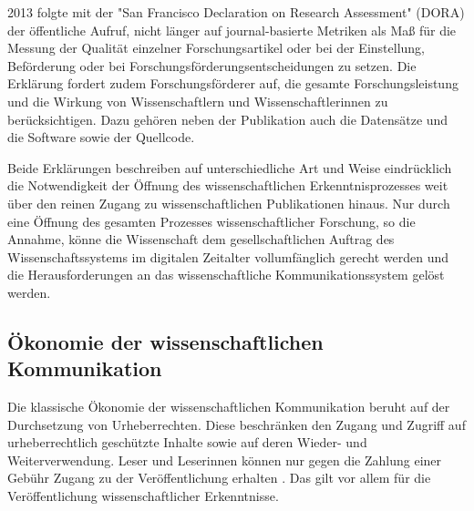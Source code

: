 2013 folgte mit der "San Francisco Declaration on Research Assessment" (DORA) \cite{DORA_2013} der öffentliche Aufruf, nicht länger auf journal-basierte Metriken als Maß für die Messung der Qualität einzelner Forschungsartikel oder bei der Einstellung, Beförderung oder bei Forschungsförderungsentscheidungen zu setzen. Die Erklärung fordert zudem Forschungsförderer auf, die gesamte Forschungsleistung und die Wirkung von Wissenschaftlern und Wissenschaftlerinnen zu berücksichtigen. Dazu gehören neben der Publikation auch die Datensätze und die Software sowie der Quellcode.

Beide Erklärungen beschreiben auf unterschiedliche Art und Weise eindrücklich die Notwendigkeit der Öffnung des wissenschaftlichen Erkenntnisprozesses weit über den reinen Zugang zu wissenschaftlichen Publikationen hinaus. Nur durch eine Öffnung des gesamten Prozesses wissenschaftlicher Forschung, so die Annahme, könne die Wissenschaft dem gesellschaftlichen Auftrag des Wissenschaftssystems im digitalen Zeitalter vollumfänglich gerecht werden und die Herausforderungen an das wissenschaftliche Kommunikationssystem gelöst werden.

\subsection{Ökonomie der wissenschaftlichen Kommunikation}

Die klassische Ökonomie der wissenschaftlichen Kommunikation beruht auf der Durchsetzung von Urheberrechten. Diese beschränken den Zugang und Zugriff auf urheberrechtlich geschützte Inhalte sowie auf deren Wieder- und Weiterverwendung. Leser und Leserinnen können nur gegen die Zahlung einer Gebühr Zugang zu der Veröffentlichung erhalten \cite{CREATe_2014}. Das gilt vor allem für die Veröffentlichung wissenschaftlicher Erkenntnisse.


